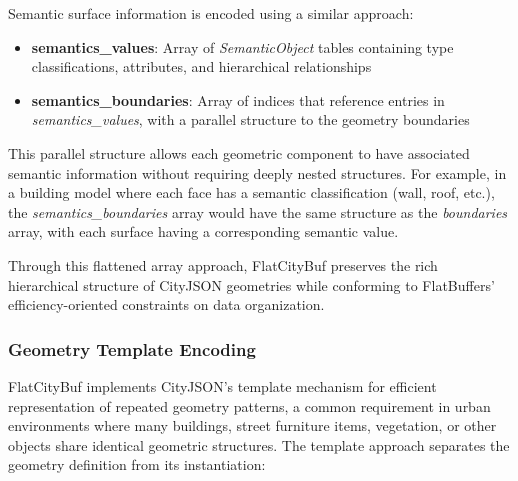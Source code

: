 Semantic surface information is encoded using a similar approach:

\begin{itemize}
  \item \textbf{semantics\_values}: Array of \textit{SemanticObject} tables containing type classifications, attributes, and hierarchical relationships
  \item \textbf{semantics\_boundaries}: Array of indices that reference entries in \textit{semantics\_values}, with a parallel structure to the geometry boundaries
\end{itemize}

This parallel structure allows each geometric component to have associated semantic information without requiring deeply nested structures. For example, in a building model where each face has a semantic classification (wall, roof, etc.), the \textit{semantics\_boundaries} array would have the same structure as the \textit{boundaries} array, with each surface having a corresponding semantic value.

Through this flattened array approach, FlatCityBuf preserves the rich hierarchical structure of CityJSON geometries while conforming to FlatBuffers' efficiency-oriented constraints on data organization.

\subsubsection{Geometry Template Encoding}
\label{methodology:feature_encoding:geometry_encoding:templates}

FlatCityBuf implements CityJSON's template mechanism for efficient representation of repeated geometry patterns, a common requirement in urban environments where many buildings, street furniture items, vegetation, or other objects share identical geometric structures. The template approach separates the geometry definition from its instantiation:

